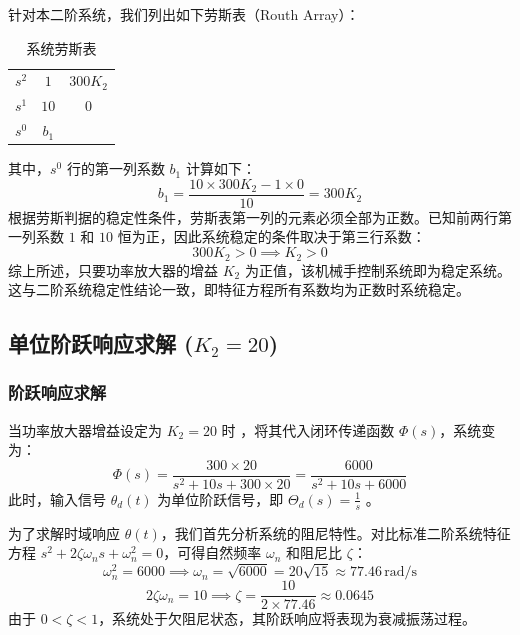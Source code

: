 \documentclass[a4paper,zihao=-4]{article}
\numberwithin{equation}{section}
\numberwithin{figure}{section}
\numberwithin{table}{section}
\begin{document}
	针对本二阶系统，我们列出如下劳斯表（Routh Array）：
	
	\begin{table}[H]
		\centering
		\caption{系统劳斯表} %
		\renewcommand{\arraystretch}{1.5}
		\begin{tabular}{c|cc}
			\toprule
			$s^2$ & $1$ & $300K_2$ \\
			$s^1$ & $10$ & $0$ \\
			$s^0$ & $b_1$ & \\
			\bottomrule
		\end{tabular}
	\end{table}
	
	其中，$s^0$ 行的第一列系数 $b_1$ 计算如下：
	\begin{equation}
		b_1 = \frac{10 \times 300K_2 - 1 \times 0}{10} = 300K_2
	\end{equation}
	根据劳斯判据的稳定性条件，劳斯表第一列的元素必须全部为正数。已知前两行第一列系数 $1$ 和 $10$ 恒为正，因此系统稳定的条件取决于第三行系数：
	\begin{equation}
		300K_2 > 0 \implies K_2 > 0
	\end{equation}
	综上所述，只要功率放大器的增益 $K_2$ 为正值，该机械手控制系统即为稳定系统。这与二阶系统稳定性结论一致，即特征方程所有系数均为正数时系统稳定。
	
	\subsection{单位阶跃响应求解 ($K_2=20$)}
	
	\subsubsection{阶跃响应求解}
	当功率放大器增益设定为 $K_2=20$ 时 ，将其代入闭环传递函数 $\Phi(s)$，系统变为：
	\begin{equation}
		\Phi(s) = \frac{300 \times 20}{s^2 + 10s + 300 \times 20} = \frac{6000}{s^2 + 10s + 6000}
	\end{equation}
	此时，输入信号 $\theta_d(t)$ 为单位阶跃信号，即 $\Theta_d(s) = \frac{1}{s}$ 。
	
	为了求解时域响应 $\theta(t)$，我们首先分析系统的阻尼特性。对比标准二阶系统特征方程 $s^2 + 2\zeta\omega_n s + \omega_n^2 = 0$，可得自然频率 $\omega_n$ 和阻尼比 $\zeta$：
	\begin{equation}
		\omega_n^2 = 6000 \implies \omega_n = \sqrt{6000} = 20\sqrt{15} \approx 77.46 \, \text{rad/s}
	\end{equation}
	\begin{equation}
		2\zeta\omega_n = 10 \implies \zeta = \frac{10}{2\times 77.46} \approx 0.0645
	\end{equation}
	由于 $0 < \zeta < 1$，系统处于欠阻尼状态，其阶跃响应将表现为衰减振荡过程。
	
\end{document}
